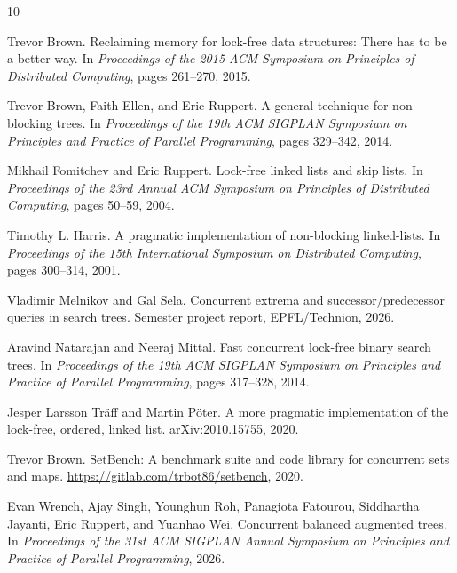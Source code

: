 \documentclass[a4paper,11pt]{article}
\begin{document}

\begin{thebibliography}{10}

Trevor Brown.
\newblock Reclaiming memory for lock-free data structures: There has to be a better way.
\newblock In \emph{Proceedings of the 2015 ACM Symposium on Principles of Distributed Computing}, pages 261--270, 2015.

Trevor Brown, Faith Ellen, and Eric Ruppert.
\newblock A general technique for non-blocking trees.
\newblock In \emph{Proceedings of the 19th ACM SIGPLAN Symposium on Principles and Practice of Parallel Programming}, pages 329--342, 2014.

Mikhail Fomitchev and Eric Ruppert.
\newblock Lock-free linked lists and skip lists.
\newblock In \emph{Proceedings of the 23rd Annual ACM Symposium on Principles of Distributed Computing}, pages 50--59, 2004.

Timothy L. Harris.
\newblock A pragmatic implementation of non-blocking linked-lists.
\newblock In \emph{Proceedings of the 15th International Symposium on Distributed Computing}, pages 300--314, 2001.

Vladimir Melnikov and Gal Sela.
\newblock Concurrent extrema and successor/predecessor queries in search trees.
\newblock Semester project report, EPFL/Technion, 2026.

Aravind Natarajan and Neeraj Mittal.
\newblock Fast concurrent lock-free binary search trees.
\newblock In \emph{Proceedings of the 19th ACM SIGPLAN Symposium on Principles and Practice of Parallel Programming}, pages 317--328, 2014.

Jesper Larsson Tr\"{a}ff and Martin P\"{o}ter.
\newblock A more pragmatic implementation of the lock-free, ordered, linked list.
\newblock arXiv:2010.15755, 2020.

Trevor Brown.
\newblock SetBench: A benchmark suite and code library for concurrent sets and maps.
\newblock \url{https://gitlab.com/trbot86/setbench}, 2020.

Evan Wrench, Ajay Singh, Younghun Roh, Panagiota Fatourou, Siddhartha Jayanti, Eric Ruppert, and Yuanhao Wei.
\newblock Concurrent balanced augmented trees.
\newblock In \emph{Proceedings of the 31st ACM SIGPLAN Annual Symposium on Principles and Practice of Parallel Programming}, 2026.

\end{thebibliography}
\end{document}
